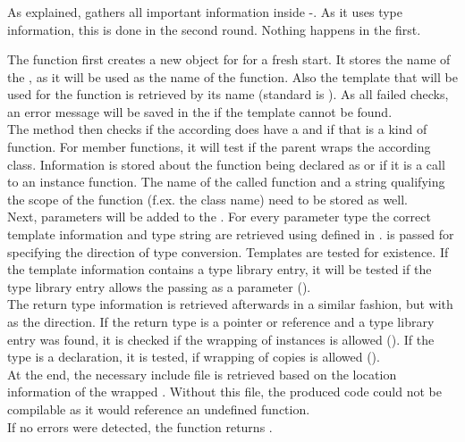 \subsubsection{}

As explained,  gathers all important information inside -. As it uses type information, this is done in the second round. Nothing happens in the first.

The function first creates a new object for  for a fresh start. It stores the name of the , as it will be used as the name of the  function. Also the template that will be used for the function is retrieved by its name (standard is ). As all failed checks, an error message will be saved in the  if the template cannot be found.\\
The method then checks if the according  does have a  and if that is a kind of function. For member functions, it will test if the parent  wraps the according class. Information is stored about the function being declared as  or if it is a call to an instance function. The name of the called  function and a string qualifying the scope of the function (f.ex. the class name) need to be stored as well. \\
Next, parameters will be added to the . For every parameter type the correct template information and type string are retrieved using  defined in .  is passed for specifying the direction of type conversion. Templates are tested for existence. If the template information contains a type library entry, it will be tested if the type library entry allows the passing as a parameter ().\\
The return type information is retrieved afterwards in a similar fashion, but with  as the direction. If the return type is a pointer or reference and a type library entry was found, it is checked if the wrapping of  instances is allowed (). If the type is a declaration, it is tested, if wrapping of copies is allowed ().\\
At the end, the necessary include file is retrieved based on the location information of the wrapped . Without this file, the produced code could not be compilable as it would reference an undefined function.\\
If no errors were detected, the function returns .

